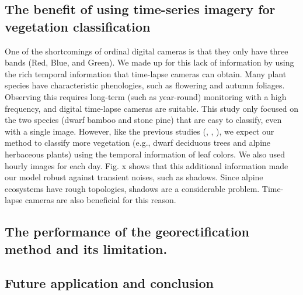 \documentclass{article}
\begin{document}
\hypertarget{the-benefit-of-using-time-series-imagery-for-vegetation-classification}{%
\subsection{The benefit of using time-series imagery for vegetation classification}\label{the-benefit-of-using-time-series-imagery-for-vegetation-classification}}

One of the shortcomings of ordinal digital cameras is that they only have three bands (Red, Blue, and Green). We made up for this lack of information by using the rich temporal information that time-lapse cameras can obtain. Many plant species have characteristic phenologies, such as flowering and autumn foliages. Observing this requires long-term (such as year-round) monitoring with a high frequency, and digital time-lapse cameras are suitable. This study only focused on the two species (dwarf bamboo and stone pine) that are easy to classify, even with a single image. However, like the previous studies (\cite{Tigges2013RemSenEnv}, \cite{Son2013RemSen}, \cite{Heupel2018PFG}), we expect our method to classify more vegetation (e.g., dwarf deciduous trees and alpine herbaceous plants) using the temporal information of leaf colors.
We also used hourly images for each day. Fig. x shows that this additional information made our model robust against transient noises, such as shadows. Since alpine ecosystems have rough topologies, shadows are a considerable problem. Time-lapse cameras are also beneficial for this reason.

\hypertarget{the-performance-of-the-georectification-method-and-its-limitation.}{%
\subsection{The performance of the georectification method and its limitation.}\label{the-performance-of-the-georectification-method-and-its-limitation.}}

\hypertarget{future-application-and-conclusion}{%
\subsection{Future application and conclusion}\label{future-application-and-conclusion}}



\end{document}
